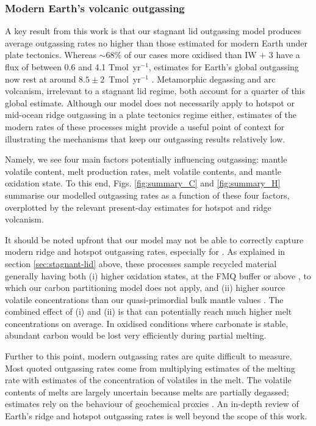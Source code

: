 \subsubsection{Modern Earth's volcanic outgassing}


A key result from this work is that our stagnant lid outgassing model produces average outgassing rates no higher than those estimated for modern Earth under plate tectonics. Whereas $\sim$68\% of our cases more oxidised than IW + 3 have a  flux of between 0.6 and 4.1 Tmol~yr$^{-1}$, estimates for Earth's global  outgassing now rest at around $8.5 \pm 2$~Tmol~yr$^{-1}$ \citep{Catling2017}. Metamorphic degassing and arc volcanism, irrelevant to a stagnant lid regime, both account for a quarter of this global estimate. Although our model does not necessarily apply to hotspot or mid-ocean ridge outgassing in a plate tectonics regime either, estimates of the modern rates of these processes might provide a useful point of context for illustrating the mechanisms that keep our outgassing results relatively low.



Namely, we see four main factors potentially influencing outgassing: mantle volatile content, melt production rates, melt volatile contents, and mantle oxidation state. To this end, Figs. \ref{fig:summary_C} and \ref{fig:summary_H} summarise our modelled outgassing rates as a function of these four factors, overplotted by the relevant present-day estimates for hotspot and ridge volcanism. 


It should be noted upfront that our model may not be able to correctly capture modern ridge and hotspot outgassing rates, especially for . As explained in section \ref{sec:stagnant-lid} above, these processes sample recycled material generally having both (i) higher oxidation states, at the FMQ buffer or above \citep{AMUNDSEN1992, MOUSSALLAM2016, ONEILL2018, MOUSSALLAM2019}, to which our carbon partitioning model does not apply, and (ii) higher source volatile concentrations than our quasi-primordial bulk mantle values \citep{Hauri2019}. The combined effect of (i) and (ii) is that  can potentially reach much higher melt concentrations on average. In oxidised conditions where carbonate is stable, abundant carbon would be lost very efficiently during partial melting.



Further to this point, modern outgassing rates are quite difficult to measure. Most quoted outgassing rates come from multiplying estimates of the melting rate with estimates of the concentration of volatiles in the melt. The volatile contents of melts are largely uncertain because melts are partially degassed; estimates rely on the behaviour of geochemical proxies \citep[see][]{Michael2015}. An in-depth review of Earth's ridge and hotspot outgassing rates is well beyond the scope of this work.

